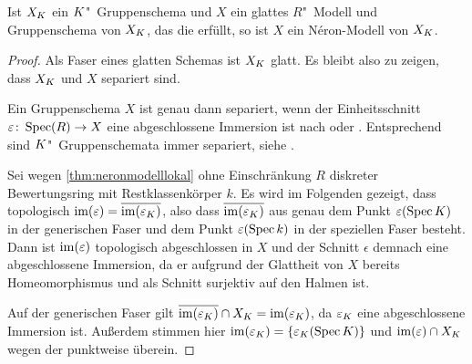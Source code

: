 \begin{Lemma}\label{nerongruppenschemaglatt}
  Ist $X_{K}$ ein $K$"~Gruppenschema und $X$ ein
  glattes $R$"~Modell und Gruppenschema von $X_{K}$, das die
  \NAbbEig erfüllt, so ist $X$ ein Néron-Modell von $X_{K}$.
  \begin{proof}
    Als Faser eines glatten Schemas ist $X_{K}$ glatt. Es bleibt also
    zu zeigen, dass $X_{K}$ und $X$ separiert sind.
    
    Ein Gruppenschema $X$ ist genau dann separiert, wenn der
    Einheitsschnitt ${\varepsilon\colon\operatorname{Spec}(R)\to X}$ eine abgeschlossene
    Immersion ist nach
    \cite[Lemma~38.6.1]{stacksproject} oder \cite[Lemma~7.1/2]{neron}.
    Entsprechend sind $K$"~Gruppenschemata immer separiert, siehe
    \cite[Lemma~38.7.3]{stacksproject}. 

    Sei wegen \ref{thm:neronmodelllokal} ohne Einschränkung $R$ diskreter
    Bewertungsring mit Restklassenkörper $k$.    
    Es wird im Folgenden gezeigt, dass topologisch
    $\operatorname{im}(\varepsilon)=\overline{\operatorname{im}(\varepsilon_{K})}$,
    also dass $\overline{\operatorname{im}(\varepsilon_{K})}$ aus genau dem Punkt
    $\varepsilon(\operatorname{Spec}K)$ in der generischen Faser und dem Punkt
    $\varepsilon(\operatorname{Spec} k)$ in der speziellen Faser besteht.
    Dann ist $\operatorname{im}(\varepsilon)$ topologisch abgeschlossen in $X$ und der
    Schnitt $\epsilon$ demnach eine abgeschlossene Immersion, da er
    aufgrund der Glattheit von $X$ bereits Homeomorphismus und als
    Schnitt surjektiv auf den Halmen ist.
    
    Auf der generischen Faser gilt
    $\overline{\operatorname{im}(\varepsilon_{K})}\cap X_{K}=\operatorname{im}(\varepsilon_{K})$,
    da $\varepsilon_{K}$ eine abgeschlossene Immersion ist.
    Außerdem stimmen hier $\operatorname{im}(\varepsilon_{K})=\{\varepsilon_{K}(\operatorname{Spec}K)\}$
    und $\operatorname{im}(\varepsilon)\cap X_{K}$ wegen der \NAbbEig punktweise
    überein.


\end{proof}
\end{Lemma}
